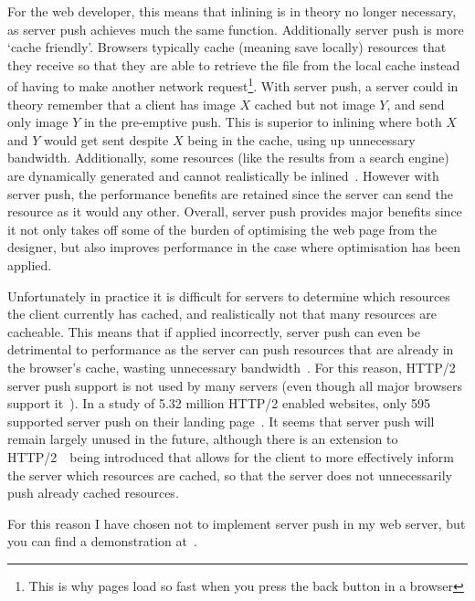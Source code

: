 For the web developer, this means that inlining is in theory no longer necessary, as server push achieves much the same function. Additionally server push is more `cache friendly'. Browsers typically cache (meaning save locally) resources that they receive so that they are able to retrieve the file from the local cache instead of having to make another network request\footnote{This is why pages load so fast when you press the back button in a browser}. With server push, a server could in theory remember that a client has image $X$ cached but not image $Y$, and send only image $Y$ in the pre-emptive push. This is superior to inlining where both $X$ and $Y$ would get sent despite $X$ being in the cache, using up unnecessary bandwidth. Additionally, some resources (like the results from a search engine) are dynamically generated and cannot realistically be inlined~\cite{cache-docs}. However with server push, the performance benefits are retained since the server can send the resource as it would any other. Overall, server push provides major benefits since it not only takes off some of the burden of optimising the web page from the designer, but also improves performance in the case where optimisation has been applied.

Unfortunately in practice it is difficult for servers to determine which resources the client currently has cached, and realistically not that many resources are cacheable. This means that if applied incorrectly, server push can even be detrimental to performance as the server can push resources that are already in the browser's cache, wasting unnecessary bandwidth~\cite{push-study}. For this reason, HTTP/2 server push support is not used by many servers (even though all major browsers support it~\cite{server-push}). In a study of 5.32 million HTTP/2 enabled websites, only 595 supported server push on their landing page~\cite{push-study}. It seems that server push will remain largely unused in the future, although there is an extension to HTTP/2~\cite{cache-digest}~being introduced that allows for the client to more effectively inform the server which resources are cached, so that the server does not unnecessarily push already cached resources.

For this reason I have chosen not to implement server push in my web server, but you can find a demonstration at~\cite{push-demo}.
